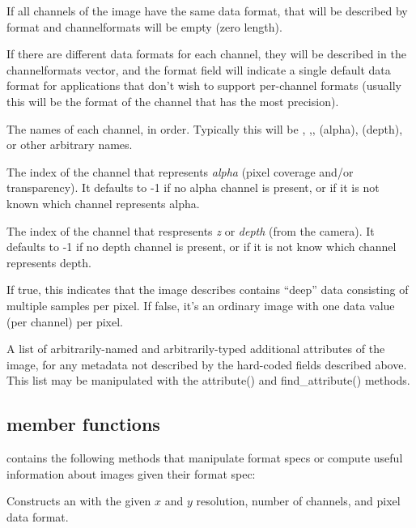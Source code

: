If all channels of the image have the same data format, that will
be described by {\cf format} and {\cf channelformats} will be empty
(zero length).

If there are different data formats for each channel, they will be
described in the {\cf channelformats} vector, and the {\cf format} field
will indicate a single default data format for applications that don't
wish to support per-channel formats (usually this will be the format
of the channel that has the most precision).
\apiend

The names of each channel, in order.  Typically this will be ,
,,  (alpha),  (depth), or other arbitrary
names.
\apiend

The index of the channel that represents \emph{alpha} (pixel coverage
and/or transparency).  It defaults to -1 if no alpha channel is present,
or if it is not known which channel represents alpha.
\apiend

The index of the channel that respresents \emph{z} or \emph{depth} (from
the camera).  It defaults to -1 if no depth channel is present, or if it
is not know which channel represents depth.
\apiend

If {\cf true}, this indicates that the image describes contains ``deep''
data consisting of multiple samples per pixel.  If {\cf false}, it's an
ordinary image with one data value (per channel) per pixel.
\apiend

A list of arbitrarily-named and arbitrarily-typed additional attributes
of the image, for any metadata not described by the hard-coded fields
described above.  This list may be manipulated with the {\cf
attribute()} and {\cf find_attribute()} methods.
\apiend

\subsection{\ImageSpec member functions}
\label{sec:ImageSpecMemberFuncs}

\noindent \ImageSpec contains the following methods that
manipulate format specs or compute useful information about images given
their format spec:

Constructs an \ImageSpec with the given $x$ and $y$ resolution, number
of channels, and pixel data format.

